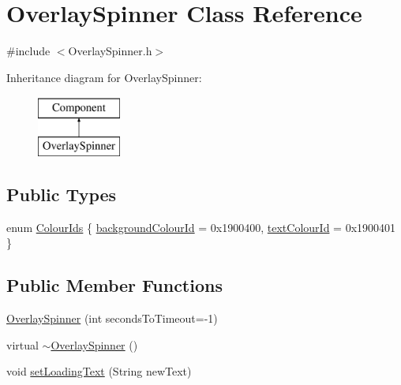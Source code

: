 \hypertarget{classOverlaySpinner}{}\section{Overlay\+Spinner Class Reference}
\label{classOverlaySpinner}


{\ttfamily \#include $<$Overlay\+Spinner.\+h$>$}

Inheritance diagram for Overlay\+Spinner\+:\begin{figure}[H]
\begin{center}
\leavevmode
\includegraphics[height=2.000000cm]{classOverlaySpinner}
\end{center}
\end{figure}
\subsection*{Public Types}
\begin{DoxyCompactItemize}
\item 
enum \mbox{\hyperlink{classOverlaySpinner_aa32ad9d4e8f1c526669af13aa22d5d98}{Colour\+Ids}} \{ \mbox{\hyperlink{classOverlaySpinner_aa32ad9d4e8f1c526669af13aa22d5d98ac388a6dadd532dbbd4564f96080722ac}{background\+Colour\+Id}} = 0x1900400, 
\mbox{\hyperlink{classOverlaySpinner_aa32ad9d4e8f1c526669af13aa22d5d98aa4191e4cc49a979ac1c4e1f6995bddb1}{text\+Colour\+Id}} = 0x1900401
 \}
\end{DoxyCompactItemize}
\subsection*{Public Member Functions}
\begin{DoxyCompactItemize}
\item 
\mbox{\hyperlink{classOverlaySpinner_a96b53ea19d81032f9528c04ab9305ca2}{Overlay\+Spinner}} (int seconds\+To\+Timeout=-\/1)
\item 
virtual \mbox{\hyperlink{classOverlaySpinner_af8f285e5a0e631f24c1e0b917d1c4912}{$\sim$\+Overlay\+Spinner}} ()
\item 
void \mbox{\hyperlink{classOverlaySpinner_aca59b7bd7666fb97c03c4cebfe310618}{set\+Loading\+Text}} (String new\+Text)
\end{DoxyCompactItemize}


